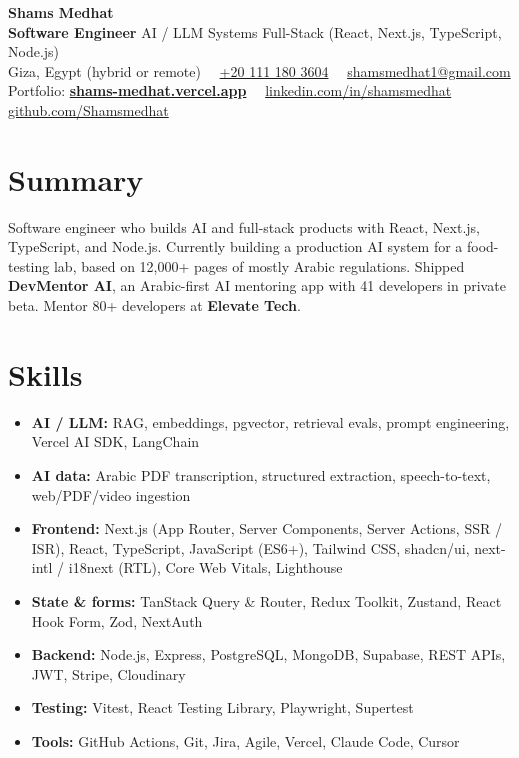 \documentclass[11pt]{article}
\newcommand{\sep}{\ \textbar\ }
\begin{document}
{\centering
  {\LARGE\bfseries Shams Medhat}\\[5pt]
  \textbf{Software Engineer} \textbar{} AI / LLM Systems \textbar{} Full-Stack
  (React, Next.js, TypeScript, Node.js)\\[4pt]
  {\small
  Giza, Egypt (hybrid or remote)\sep
  \href{tel:+201111803604}{+20 111 180 3604}\sep
  \href{mailto:shamsmedhat1@gmail.com}{shamsmedhat1@gmail.com}\\[2pt]
  Portfolio: \href{https://shams-medhat.vercel.app}{\textbf{shams-medhat.vercel.app}}\sep
  \href{https://www.linkedin.com/in/shamsmedhat/}{linkedin.com/in/shamsmedhat}\sep
  \href{https://github.com/Shamsmedhat}{github.com/Shamsmedhat}}\par}

\section{Summary}
Software engineer who builds AI and full-stack products with React, Next.js, TypeScript, and
Node.js. Currently building a production AI system for a food-testing lab, based on 12,000+
pages of mostly Arabic regulations. Shipped \textbf{DevMentor AI}, an Arabic-first AI mentoring
app with 41 developers in private beta. Mentor 80+ developers at \textbf{Elevate Tech}.

\section{Skills}
\begin{itemize}
  \item \textbf{AI / LLM:} RAG, embeddings, pgvector, retrieval evals, prompt engineering,
        Vercel AI SDK, LangChain
  \item \textbf{AI data:} Arabic PDF transcription, structured extraction, speech-to-text,
        web/PDF/video ingestion
  \item \textbf{Frontend:} Next.js (App Router, Server Components, Server Actions, SSR / ISR),
        React, TypeScript, JavaScript (ES6+), Tailwind CSS, shadcn/ui, next-intl / i18next (RTL),
        Core Web Vitals, Lighthouse
  \item \textbf{State \& forms:} TanStack Query \& Router, Redux Toolkit, Zustand,
        React Hook Form, Zod, NextAuth
  \item \textbf{Backend:} Node.js, Express, PostgreSQL, MongoDB, Supabase, REST APIs, JWT, Stripe,
        Cloudinary
  \item \textbf{Testing:} Vitest, React Testing Library, Playwright, Supertest
  \item \textbf{Tools:} GitHub Actions, Git, Jira, Agile, Vercel, Claude Code, Cursor
\end{itemize}
\end{document}
